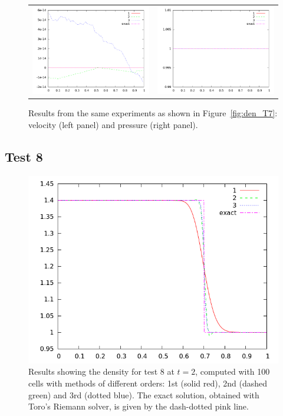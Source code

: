\documentclass[10pt]{article}
\begin{document}
\begin{figure}
  \begin{center}
	\begin{tabular}{cc}
      \includegraphics[width=.425\textwidth]{vel_T7.png} &
	  \includegraphics[width=.425\textwidth]{prs_T7.png}
	\end{tabular}
  \end{center}
  \caption{Results from the same experiments as shown in Figure~\ref{fig:den_T7}:
  velocity (left panel) and pressure (right panel).}
\end{figure}

\clearpage

\subsection{Test 8}

\begin{figure}[h]
  \begin{center}
     \includegraphics[width=.78\textwidth]{den_T8.png}	
  \end{center}
  \caption{Results showing the density for test 8 at $t=2$, computed with 100 cells with methods of different orders: 1st (solid red), 2nd (dashed green) and 3rd (dotted blue). The exact solution, obtained with Toro's Riemann solver, is given by the dash-dotted pink line.}
  \label{fig:den_T8}
\end{figure}
\end{document}
